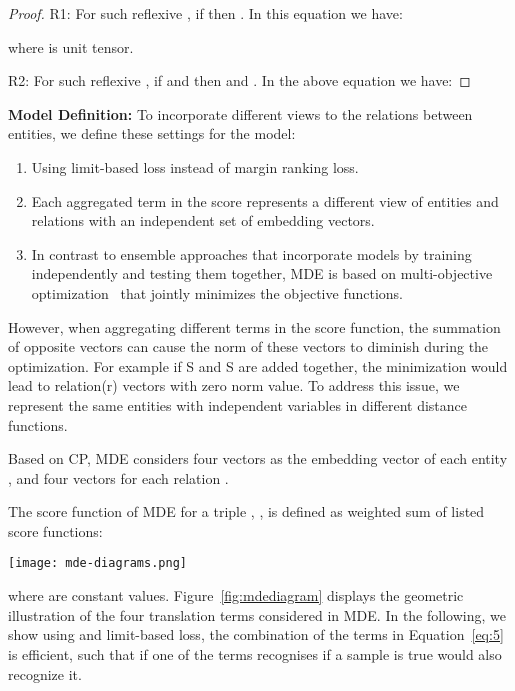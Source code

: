 \documentclass{ecai}
\begin{document}
\begin{proof}R1: For such reflexive , if  then . 
In this equation we have:

where  is unit tensor.

R2: For such reflexive , if  and  then  and . 
In the above equation we have:

\qedhere
\end{proof}


\textbf{Model Definition:} To incorporate different views to the relations between entities, we define these settings for the model:
\begin{enumerate}
    \item Using limit-based loss instead of margin ranking loss.
    \item Each aggregated term in the score represents a different view of entities and relations with an independent set of embedding vectors.
    \item In contrast to ensemble approaches that incorporate models by training independently and testing them together, MDE is based on multi-objective optimization~\cite{marler2004survey} that jointly minimizes the objective functions. 
\end{enumerate}


However, when aggregating different terms in the score function, the summation of opposite vectors can cause the norm of these vectors to diminish during the optimization. For example if S and S are added together, the minimization would lead to relation(r) vectors with zero norm value.
To address this issue, we represent the same entities with independent variables in different distance functions. 



Based on CP, MDE considers four vectors  as the embedding vector of each entity 
, and four vectors  for each relation . 

The score function of MDE for a triple , ,  is defined as weighted sum of listed score functions:





\begin{figure*}[t]
\centering
\texttt{[image: mde-diagrams.png]}
\caption{Geometric illustration of the translation terms considered in MDE.}
\label{fig:mdediagram}
\end{figure*}

where  are constant values. Figure~\ref{fig:mdediagram} displays the geometric illustration of the four translation terms considered in MDE. In the following, we show using  and limit-based loss, the combination of the terms in Equation~\eqref{eq:5} is efficient, such that if one of the terms recognises if a sample is true  would also recognize it.
\end{document}
